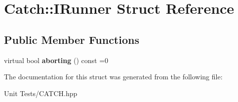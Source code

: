 \hypertarget{structCatch_1_1IRunner}{}\section{Catch\+:\+:I\+Runner Struct Reference}
\label{structCatch_1_1IRunner}
\subsection*{Public Member Functions}
\begin{DoxyCompactItemize}
\item 
virtual bool {\bfseries aborting} () const =0\hypertarget{structCatch_1_1IRunner_a03713202dd2e041e30b8030088ab0116}{}\label{structCatch_1_1IRunner_a03713202dd2e041e30b8030088ab0116}

\end{DoxyCompactItemize}


The documentation for this struct was generated from the following file\+:\begin{DoxyCompactItemize}
\item 
Unit Tests/C\+A\+T\+C\+H.\+hpp\end{DoxyCompactItemize}
